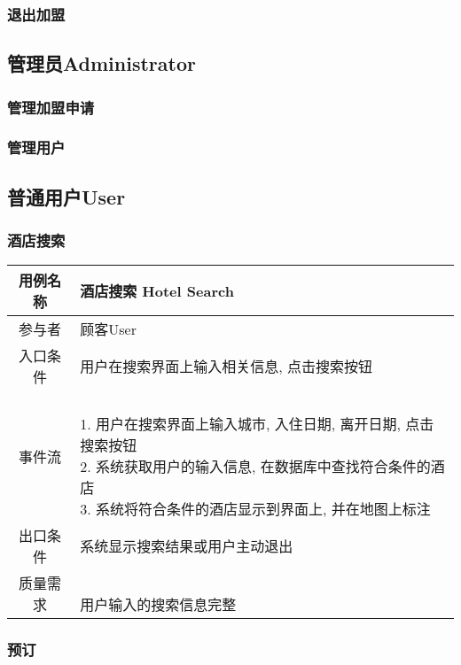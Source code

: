 \documentclass[11pt]{article}
\begin{document}
		\subsubsection{退出加盟}
		
	\subsection{管理员Administrator}
		\subsubsection{管理加盟申请}
		\subsubsection{管理用户}
		
		
	
	\subsection{普通用户User}
	
		\subsubsection{酒店搜索}
			\begin{tabular}{c|l}
			\hline
			用例名称 & 酒店搜索 Hotel Search \\ \hline
			参与者 & 顾客User  \\ \hline
			入口条件 & 用户在搜索界面上输入相关信息, 点击搜索按钮 \\ \hline
			事件流 & 	\parbox{33em}{\ \\
						1. 用户在搜索界面上输入城市, 入住日期,  离开日期, 点击搜索按钮 \\
						2. 系统获取用户的输入信息, 在数据库中查找符合条件的酒店 \\
						3. 系统将符合条件的酒店显示到界面上, 并在地图上标注  \\
						} \\ \hline
			出口条件 & 系统显示搜索结果或用户主动退出 \\ \hline
			质量需求 & \parbox{33em}{\ \\
						用户输入的搜索信息完整 \\
						} \\ \hline
			\end{tabular}

		\subsubsection{预订}
\end{document}
